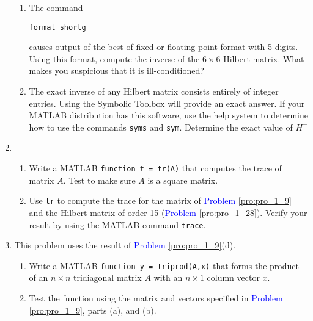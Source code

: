 \documentclass[../main.tex]{subfiles}
\begin{document}
\begin{enumerate}[label=\textbf{1.\arabic*}]
	\begin{enumerate}[label = \textbf{\alph*.}]
	\item The command
	\begin{lstlisting}[numbers=none,frame=none]
	format shortg
	\end{lstlisting}
	causes output of the best of fixed or floating point format with 5 digits. Using this format, compute the inverse of the $6 \times 6$ Hilbert matrix. What makes you suspicious that it is ill-conditioned?
	\item The exact inverse of any Hilbert matrix consists entirely of integer entries. Using the Symbolic Toolbox will provide an exact answer. If your MATLAB distribution has this software, use the help system to determine how to use the commands \texttt{syms} and \texttt{sym}. Determine the exact value of $H^{-}$
	\end{enumerate}

\item
	\begin{enumerate}[label = \textbf{\alph*.}]
	\item Write a MATLAB \texttt{function t = tr(A)} that computes the trace of matrix $A$. Test to make sure $A$ is a square matrix.
	\item Use \texttt{tr} to compute the trace for the matrix of \textcolor{blue}{Problem \ref{pro:pro_1_9}} and the Hilbert matrix of order 15 (\textcolor{blue}{Problem \ref{pro:pro_1_28}}). Verify your result by using the MATLAB command \texttt{trace}.
	\end{enumerate}

\item This problem uses the result of \textcolor{blue}{Problem \ref{pro:pro_1_9}}(d).
	\begin{enumerate}[label = \textbf{\alph*.}]
		\item Write a MATLAB \texttt{function y = triprod(A,x)} that forms the product of an $n \times  n$ tridiagonal matrix $A$ with an $n \times 1$ column vector $x$.
		\item Test the function using the matrix and vectors specified in \textcolor{blue}{Problem \ref{pro:pro_1_9}}, parts (a), and (b).
	\end{enumerate}
\end{enumerate}

\clearpage
\end{document}
